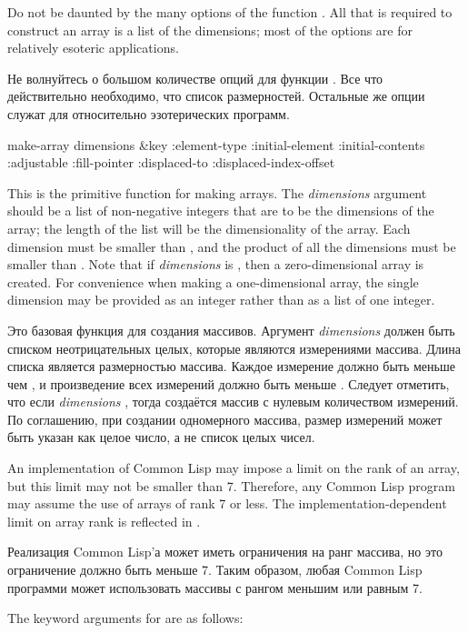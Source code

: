 Do not be daunted by the many options of the function .
All that is required to construct an array is a list of
the dimensions; most of the options are for relatively esoteric
applications.

Не волнуйтесь о большом количестве опций для функции .
Все что действительно необходимо, что список размерностей. Остальные же опции
служат для относительно эзотерических программ.

\begin{defun}[Function]
make-array dimensions &key :element-type :initial-element :initial-contents :adjustable :fill-pointer :displaced-to :displaced-index-offset

This is the primitive function for making arrays.  The \emph{dimensions} argument
should be a list of non-negative integers
that are to be the dimensions of the array; the
length of the list will be the dimensionality of the array.  
Each dimension must be smaller than ,
and the product of all the dimensions must be smaller than
.
Note that if \emph{dimensions} is {\nil}, then a zero-dimensional array is created.
For convenience when making a one-dimensional array, the single dimension
may be provided as an integer rather than as a list of one integer.

Это базовая функция для создания массивов. Аргумент \emph{dimensions} должен
быть списком неотрицательных целых, которые являются измерениями массива. Длина
списка является размерностью массива. Каждое измерение должно быть меньше чем
, и произведение всех измерений должно быть меньше
.
Следует отметить, что если \emph{dimensions} {\nil}, тогда создаётся массив с
нулевым количеством измерений.
По соглашению, при создании одномерного массива, размер измерений может
быть указан как целое число, а не список целых чисел.

An implementation of Common Lisp may impose a limit on the rank of an array,
but this limit may not be smaller than 7.  Therefore, any Common Lisp
program may assume the use of arrays of rank 7 or less.
The implementation-dependent limit on array rank is reflected in
.

Реализация Common Lisp'а может иметь ограничения на ранг массива, но это
ограничение должно быть меньше 7. Таким образом, любая Common
Lisp программи может использовать массивы с рангом меньшим или равным 7.

The keyword arguments for  are as follows:


\end{defun}

